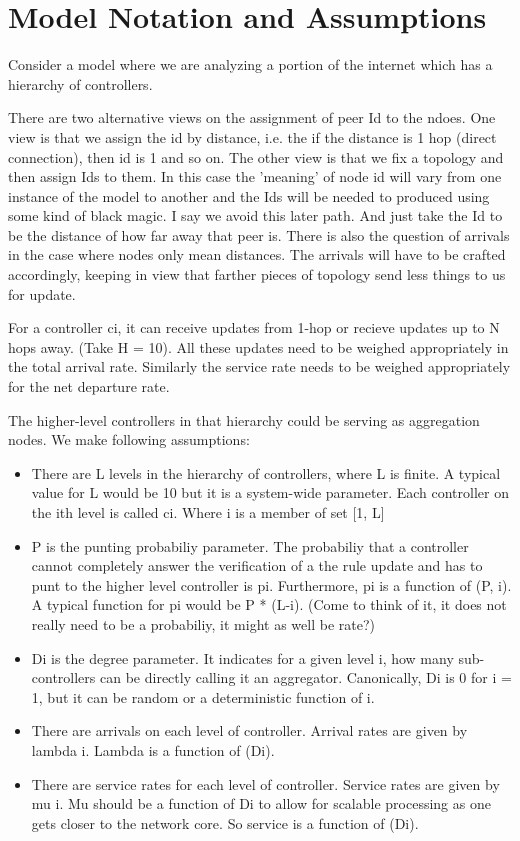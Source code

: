 \documentclass[a4paper,10pt]{article}
\begin{document}
\section{Model Notation and Assumptions}
Consider a model where we are analyzing a portion of the internet which has a hierarchy of controllers.

There are two alternative views on the assignment of peer Id to the ndoes. One view is that we assign the id by distance, i.e. the if the distance is 1 hop (direct connection), then id is 1 and so on. The other view is that we fix a topology and then assign Ids to them. In this case the 'meaning' of node id will vary from one instance of the model to another and the Ids will be needed to produced using some kind of black magic. I say we avoid this later path. And just take the Id to be the distance of how far away that peer is. There is also the question of arrivals in the case where nodes only mean distances. The arrivals will have to be crafted accordingly, keeping in view that farther pieces of topology send less things to us for update.

For a controller ci, it can receive updates from 1-hop or recieve updates up to N hops away. (Take H = 10). All these updates need to be weighed appropriately in the total arrival rate. Similarly the service rate needs to be weighed appropriately for the net departure rate. 



The higher-level controllers in that hierarchy could be serving as aggregation nodes. We make following assumptions:

\begin {itemize}
 \item There are L levels in the hierarchy of controllers, where L is finite. A typical value for L would be 10 but it is a system-wide parameter. Each controller on the ith level is called ci. Where i is a member of set [1, L]
 \item P is the punting probabiliy parameter. The probabiliy that a controller cannot completely answer the verification of a the rule update and has to punt to the higher level controller is pi. Furthermore, pi is a function of (P, i). A typical function for pi would be P * (L-i). (Come to think of it, it does not really need to be a probabiliy, it might as well be rate?)
 \item Di is the degree parameter. It indicates for a given level i, how many sub-controllers can be directly calling it an aggregator. Canonically, Di is 0 for i = 1, but it can be random or a deterministic function of i.
 \item There are arrivals on each level of controller. Arrival rates are given by lambda i. Lambda is a function of (Di). 
 \item There are service rates for each level of controller. Service rates are given by mu i. Mu should be a function of Di to allow for scalable processing as one gets closer to the network core. So service is a function of (Di). 

\end {itemize}
\end{document}
